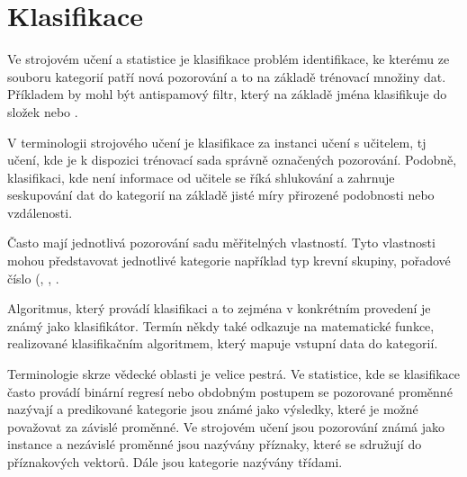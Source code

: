\documentclass[12pt, a4paper]{article}
\begin{document}
\section{Klasifikace}
\par{Ve strojovém učení a statistice je klasifikace problém identifikace, ke kterému ze souboru kategorií patří nová pozorování a to na základě trénovací množiny dat. Příkladem by mohl být antispamový filtr, který na základě jména klasifikuje do složek  nebo .}

\par{V terminologii strojového učení je klasifikace za instanci učení s učitelem, tj učení, kde je k dispozici trénovací sada správně označených pozorování. Podobně, klasifikaci, kde není informace od učitele se říká shlukování a zahrnuje seskupování dat do kategorií na základě jisté míry přirozené podobnosti nebo vzdálenosti.}

\par{Často mají jednotlivá pozorování sadu měřitelných vlastností. Tyto vlastnosti mohou představovat jednotlivé kategorie například typ krevní skupiny, pořadové číslo (, , .}

\par{Algoritmus, který provádí klasifikaci a to zejména v konkrétním provedení je známý jako klasifikátor. Termín  někdy také odkazuje na matematické funkce, realizované klasifikačním algoritmem, který mapuje vstupní data do kategorií.}

\par{Terminologie skrze vědecké oblasti je velice pestrá. Ve statistice, kde se klasifikace často provádí binární regresí nebo obdobným postupem se pozorované proměnné nazývají  a predikované kategorie jsou známé jako výsledky, které je možné považovat za závislé proměnné. Ve strojovém učení jsou pozorování známá jako instance a nezávislé proměnné jsou nazývány příznaky, které se sdružují do příznakových vektorů. Dále jsou kategorie nazývány třídami.}












\end{document}
